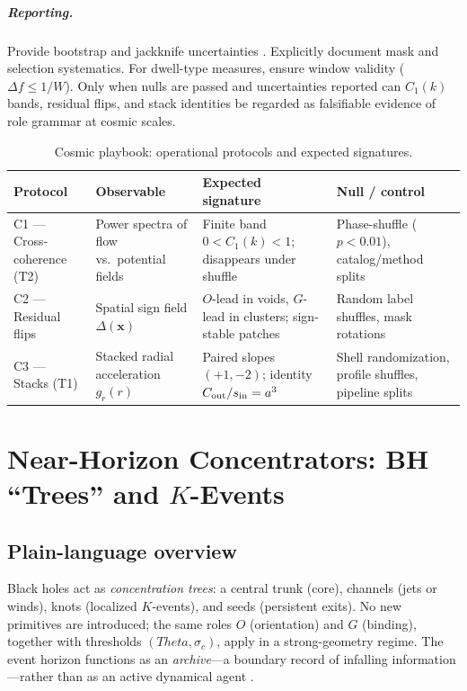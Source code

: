 \documentclass[12pt,a4paper,oneside]{scrreprt}
\def\Theta{Theta}%
\begin{document}
\paragraph{Reporting.} 
Provide bootstrap and jackknife uncertainties 
\citep{Efron1993Bootstrap}. 
Explicitly document mask and selection systematics. 
For dwell-type measures, ensure window validity 
($\Delta f \leq 1/W$). 
Only when nulls are passed and uncertainties reported can 
$C_1(k)$ bands, residual flips, and stack identities be regarded as 
falsifiable evidence of role grammar at cosmic scales.

\begin{table}[h]
\centering
\caption{Cosmic playbook: operational protocols and expected signatures.}
\begin{tabular}{p{2.5cm} p{3.8cm} p{3.8cm} p{3.6cm}}
\toprule
\textbf{Protocol} & \textbf{Observable} & \textbf{Expected signature} & \textbf{Null / control} \\
\midrule
C1 — Cross-coherence (T2) & Power spectra of flow vs.\ potential fields & Finite band $0 < C_1(k) < 1$; disappears under shuffle & Phase-shuffle ($p < 0.01$), catalog/method splits \\
\addlinespace
C2 — Residual flips & Spatial sign field $\Delta(\mathbf x)$ & $O$-lead in voids, $G$-lead in clusters; sign-stable patches & Random label shuffles, mask rotations \\
\addlinespace
C3 — Stacks (T1) & Stacked radial acceleration $g_r(r)$ & Paired slopes $(+1,-2)$; identity $C_{\rm out}/s_{\rm in} = a^3$ & Shell randomization, profile shuffles, pipeline splits \\
\bottomrule
\end{tabular}
\end{table}

\chapter{Near-Horizon Concentrators: BH ``Trees'' and $K$-Events}\label{ch:bh-tree}

\section*{Plain-language overview}

Black holes act as \emph{concentration trees}: a central trunk (core), 
channels (jets or winds), knots (localized $K$-events), 
and seeds (persistent exits). 
No new primitives are introduced; the same roles $O$ (orientation) 
and $G$ (binding), together with thresholds $(\Theta, \sigma_c)$, 
apply in a strong-geometry regime. 
The event horizon functions as an \emph{archive}—a boundary record of 
infalling information—rather than as an active dynamical agent 
\citep{Bardeen1973,Kerr1963,Thorne1994}. 
\end{document}
